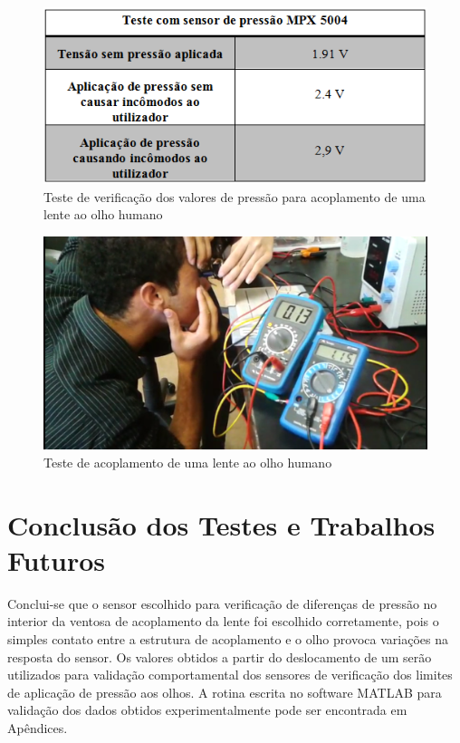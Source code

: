 \begin{figure}[H]
		\centering
			\includegraphics[scale=1.0]{figuras/pressaoolho.png}
		\caption{Teste de verificação dos valores de pressão para acoplamento de uma lente ao olho humano}
		\label{pressaoolho}
\end{figure}


\begin{figure}[H]
		\centering
			\includegraphics[scale=0.5]{figuras/pressaoolho2.png}
		\caption{Teste de acoplamento de uma lente ao olho humano}
		\label{pressaoolho2}
\end{figure}

\section[Conclusão dos Testes e Trabalhos Futuros]{Conclusão dos Testes e Trabalhos Futuros}

Conclui-se que o sensor escolhido para verificação de diferenças de pressão no interior da ventosa de acoplamento da lente foi escolhido corretamente, pois o simples contato entre a estrutura de acoplamento e o olho provoca variações na resposta do sensor. Os valores obtidos a partir do deslocamento de um serão utilizados para validação comportamental dos sensores de verificação dos limites de aplicação de pressão aos olhos.  A rotina escrita no software MATLAB para validação dos dados obtidos experimentalmente pode ser encontrada em Apêndices.